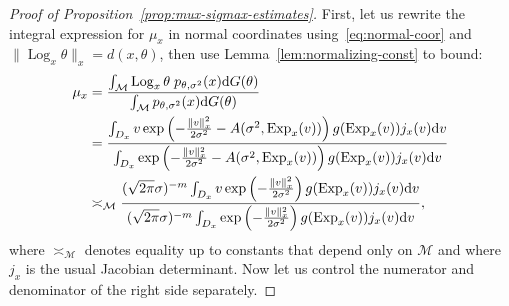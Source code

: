 \documentclass[preprint]{imsart}
\theoremstyle{plain}
\theoremstyle{definition}
\newcommand{\Mcal}{\mathcal{M}}
\newcommand{\diff}{\textnormal{d}}
\DeclareMathOperator{\Log}{Log}
\DeclareMathOperator{\Exp}{Exp}
\begin{document}
\begin{appendix}
\begin{proof}[Proof of Proposition~\ref{prop:mux-sigmax-estimates}]
    First, let us rewrite the integral expression for $\mu_x$ in normal coordinates using~\eqref{eq:normal-coor} and $\|\Log_x\theta\|_x = d(x,\theta)$, then use Lemma~\ref{lem:normalizing-const} to bound:
    \begin{equation}\label{eqn:mux-1}
        \begin{split}
        \mu_x &= \frac{\int_{\Mcal}\Log_x\theta \;p_{\theta,\sigma^2}(x)\diff G(\theta)}{\int_{\Mcal} p_{\theta,\sigma^2}(x)\diff G(\theta)} \\
        &= \frac{\int_{D_x}v \exp\left(-\frac{\|v\|_x^2}{2\sigma^2}-A(\sigma^2,\Exp_x(v))\right)g(\Exp_x(v))j_x(v)\diff v}{\int_{D_x} \exp\left(-\frac{\|v\|_x^2}{2\sigma^2}-A(\sigma^2,\Exp_x(v))\right)g(\Exp_x(v))j_x(v)\diff v} \\
        &\asymp_{\Mcal} \frac{(\sqrt{2\pi}\sigma)^{-m}\int_{D_x}v \exp\left(-\frac{\|v\|_x^2}{2\sigma^2}\right)g(\Exp_x(v))j_x(v)\diff v}{(\sqrt{2\pi}\sigma)^{-m}\int_{D_x} \exp\left(-\frac{\|v\|_x^2}{2\sigma^2}\right)g(\Exp_x(v))j_x(v)\diff v},
        \end{split}
    \end{equation}
    where $\asymp_{\Mcal}$ denotes equality up to constants that depend only on $\Mcal$ and where $j_x$ is the usual Jacobian determinant. Now let us control the numerator and denominator of the right side separately.


\end{proof}
\end{appendix}
\end{document}
